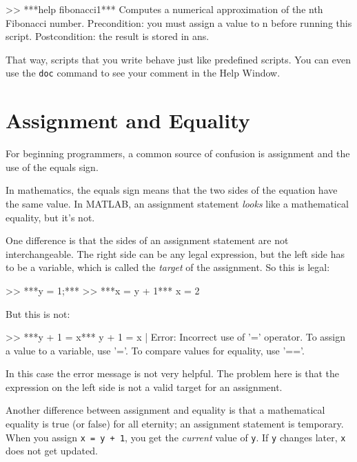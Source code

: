 \begin{code}
>> ***help fibonacci1***
  Computes a numerical approximation of the nth Fibonacci number.  
  Precondition: you must assign a value to n before running this script.
  Postcondition: the result is stored in ans.
\end{code}

That way, scripts that you write behave just like predefined scripts.
You can even use the \lstinline{doc} command to see your comment in the
Help Window.


\section{Assignment and Equality}

For beginning programmers, a common source of confusion is assignment and the use of the equals sign.


In mathematics, the equals sign means that the two sides of the
equation have the same value.
In MATLAB, an assignment statement \emph{looks} like a mathematical equality, but it's not.

One difference is that the sides of an assignment statement are not
interchangeable.  The right side can be any legal expression, but
the left side has to be a variable, which is called the 
\emph{target} of the assignment.  So this is legal:

\begin{code}
>> ***y = 1;***
>> ***x = y + 1***
x = 2
\end{code}

But this is not:

\begin{code}
>> ***y + 1 = x***
 y + 1 = x
       |
Error: Incorrect use of '=' operator. 
To assign a value to a variable, use '='. 
To compare values for equality, use '=='.
\end{code}

In this case the error message is not very helpful.  The problem here is that the expression on the left side is not a valid target for an assignment.


Another difference between assignment and equality is that a mathematical equality is true (or false) for all eternity;
an assignment statement is temporary.
When you assign \lstinline{x = y + 1}, you get the
\emph{current} value of \lstinline{y}.  If \lstinline{y} changes later, \lstinline{x}
does not get updated.

